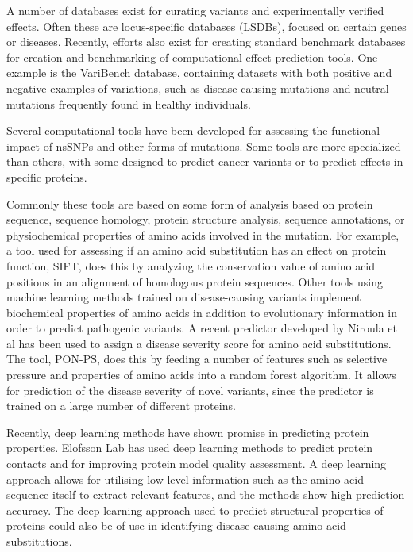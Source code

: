 \documentclass[11pt]{article}
\begin{document}
A number of databases exist for curating variants and experimentally verified effects. Often these are locus-specific databases (LSDBs), focused on certain genes or diseases. Recently, efforts also exist for creating standard benchmark databases for creation and benchmarking of computational effect prediction tools. One example is the VariBench\cite{nair2013varibench} database, containing datasets with both positive and negative examples of variations, such as disease-causing mutations and neutral mutations frequently found in healthy individuals.

Several computational tools have been developed for assessing the functional impact of nsSNPs and other forms of mutations. Some tools are more specialized than others, with some designed to predict cancer variants\cite{reva2011predicting} or to predict effects in specific proteins\cite{niroula2015classification}. 

Commonly these tools are based on some form of analysis based on protein sequence, sequence homology, protein structure analysis, sequence annotations, or physiochemical properties of amino acids involved in the mutation\cite{ng2006predicting}. For example, a tool used for assessing if an amino acid substitution has an effect on protein function, SIFT, does this by analyzing the conservation value of amino acid positions in an alignment of homologous protein sequences\cite{kumar2009predicting}. Other tools using machine learning methods trained on disease-causing variants implement biochemical properties of amino acids in addition to evolutionary information in order to predict pathogenic variants\cite{niroula2015pon}. A recent predictor developed by Niroula et al\cite{niroula2017predicting} has been used to assign a disease severity score for amino acid substitutions. The tool, PON-PS, does this by feeding a number of features such as selective pressure and properties of amino acids into a random forest algorithm. It allows for prediction of the disease severity of novel variants, since the predictor is trained on a large number of different proteins.

Recently, deep learning methods have shown promise in predicting protein properties.
Elofsson Lab has used deep learning methods to predict protein contacts and for improving protein model quality assessment\cite{skwark2014improved}\cite{uziela2017proq3d}. A deep learning approach allows for utilising low level information such as the amino acid sequence itself to extract relevant features, and the methods show high prediction accuracy. The deep learning approach used to predict structural properties of proteins could also be of use in identifying disease-causing amino acid substitutions.
\end{document}
